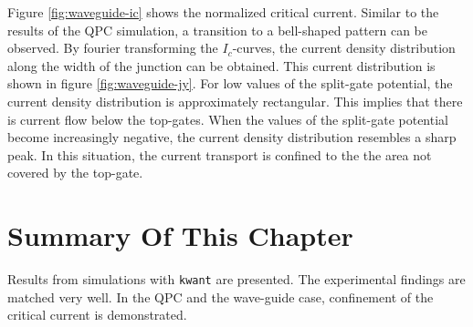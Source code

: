 Figure \ref{fig:waveguide-ic} shows the normalized critical current. Similar to the results of the QPC simulation, a transition to a bell-shaped pattern can be observed. By fourier transforming the $I_c$-curves, the current density distribution along the width of the junction can be obtained. This current distribution is shown in figure \ref{fig:waveguide-jy}. For low values of the split-gate potential, the current density distribution is approximately rectangular. This implies that there is current flow below the top-gates. When the values of the split-gate potential become increasingly negative, the current density distribution resembles a sharp peak. In this situation, the current transport is confined to the the area not covered by the top-gate.

\section{Summary Of This Chapter}
Results from simulations with \texttt{kwant} are presented. The experimental findings are matched very well. In the QPC and the wave-guide case, confinement of the critical current is demonstrated. 